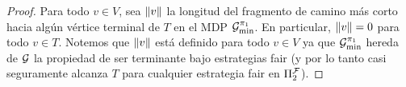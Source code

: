 \begin{proof}

  
  Para todo $v\in V$, sea ${\lVert{v}\rVert}$ la longitud del fragmento de camino más corto hacia algún vértice terminal de $T$ en el MDP
  $\mathcal{G}^{\pi_{1}}_{\min}$.   En particular, ${\lVert{v}\rVert}=0$ para todo $v\in T$.  Notemos que ${\lVert{v}\rVert}$ está definido para todo
  $v\in V$ ya que $\mathcal{G}^{\pi_{1}}_{\min}$ hereda de $\mathcal{G}$ la
  propiedad de ser terminante bajo estrategias fair (y por lo tanto casi seguramente alcanza
  $T$ para cualquier estrategia fair en $\Pi^{\mathcal{F}}_{2}$).
  

\end{proof}
